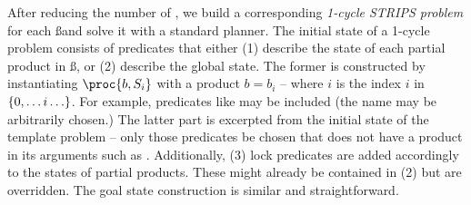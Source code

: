 After reducing the number of \sss,
we build a corresponding {\em 1-cycle STRIPS problem} for each \ss and solve it with a standard planner.
%
The initial state of a 1-cycle problem
 consists of predicates that either (1) describe the state of each partial product in \ss, or
(2) describe the global state.
The former is constructed by instantiating $\proc{b,S_i}$ with a product $b=b_{i}$
-- where $i$ is the index $i$ in \msss $\left\{0,\ldots i \ldots\right\}$.
For example, predicates like 
may be included (the name may be arbitrarily chosen.)
%
The latter part is excerpted from the initial state of the template problem --
only those predicates be chosen that does not have a product in its arguments
such as .
%
Additionally, (3) lock %
predicates are added %
accordingly to the
states of partial products. These might already be contained in (2) but are overridden.
The goal state construction is similar and straightforward. %






